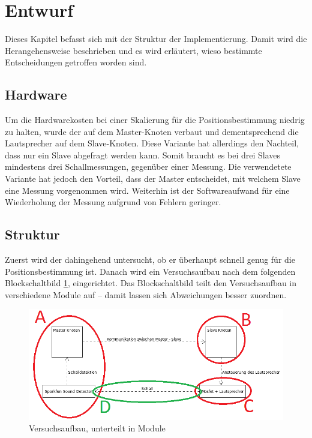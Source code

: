 \newpage
\section{Entwurf}
Dieses Kapitel befasst sich mit der Struktur der Implementierung. Damit wird die Herangehensweise beschrieben und es wird erläutert, wieso bestimmte Entscheidungen getroffen worden sind.

\subsection{Hardware}
Um die Hardwarekosten bei einer Skalierung für die Positionsbestimmung niedrig zu halten, wurde der \microphone \platz auf dem Master-Knoten verbaut und dementsprechend die Lautsprecher auf dem Slave-Knoten. Diese Variante hat allerdings den Nachteil, dass nur ein Slave abgefragt werden kann. Somit braucht es bei drei Slaves mindestens drei Schallmessungen, gegenüber einer Messung. Die verwendetete Variante hat jedoch den Vorteil, dass der Master entscheidet, mit welchem Slave eine Messung vorgenommen wird. Weiterhin ist der Softwareaufwand für eine Wiederholung der Messung aufgrund von Fehlern geringer.

\subsection{Struktur}
Zuerst wird der \microphone \platz dahingehend untersucht, ob er überhaupt schnell genug für die Positionsbestimmung ist. Danach wird ein Versuchsaufbau nach dem folgenden Blockschaltbild \ref{img:kommunikation_module}, eingerichtet. Das Blockschaltbild teilt den Versuchsaufbau in verschiedene Module auf -- damit lassen sich Abweichungen besser zuordnen.

\begin{figure}[H]
	\centering
	\hspace*{-2.6cm}
	\includegraphics[width=1.3\textwidth]{images/Kommunikation_Module.png}
	\caption{Versuchsaufbau, unterteilt in Module}
	\label{img:kommunikation_module}
\end{figure}

